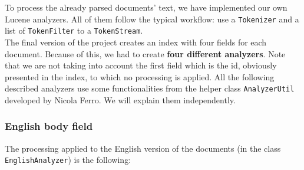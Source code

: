 To process the already parsed documents' text, we have implemented our own Lucene analyzers.
All of them follow the typical workflow: use a \texttt{Tokenizer} and a list of \texttt{TokenFilter} to a
\texttt{TokenStream}.\\

The final version of the project creates an index with four fields for each document.
Because of this, we had to create \textbf{four different analyzers}.
Note that we are not taking into account the first field which is the id, obviously presented in the index, to which no
processing is applied.
All the following described analyzers use some functionalities from the helper class \texttt{AnalyzerUtil} developed by
Nicola Ferro.
We will explain them independently.\\

\subsubsection{English body field}
The processing applied to the English version of the documents (in the class \texttt{EnglishAnalyzer}) is the following:
